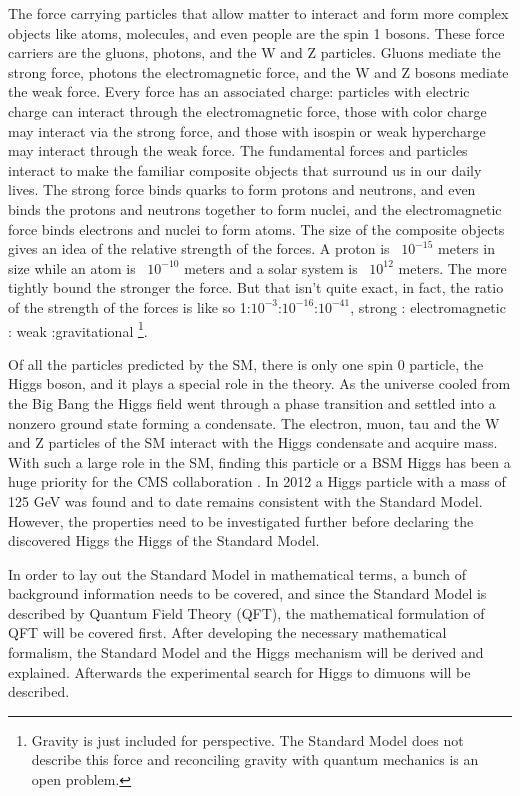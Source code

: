 The force carrying particles that allow matter to interact and form more complex objects like atoms, molecules, and even people are the spin 1 bosons. These force carriers are the gluons, photons, and the W and Z particles. Gluons mediate the strong force, photons the electromagnetic force, and the W and Z bosons mediate the weak force. Every force has an associated charge: particles with electric charge can interact through the electromagnetic force, those with color charge may interact via the strong force, and those with isospin or weak hypercharge may interact through the weak force. The fundamental forces and particles interact to make the familiar composite objects that surround us in our daily lives. The strong force binds quarks to form protons and neutrons, and even binds the protons and neutrons together to form nuclei, and the electromagnetic force binds electrons and nuclei to form atoms. The size of the composite objects gives an idea of the relative strength of the forces. A proton is ~$10^{-15}$ meters in size while an atom is ~$10^{-10}$ meters and a solar system is ~$10^{12}$ meters. The more tightly bound the stronger the force. But that isn't quite exact, in fact, the ratio of the strength of the forces is like so 1:$10^{-3}$:$10^{-16}$:$10^{-41}$, strong : electromagnetic : weak :gravitational \footnote{Gravity is just included for perspective. The Standard Model does not describe this force and reconciling gravity with quantum mechanics is an open problem.}. 

Of all the particles predicted by the SM, there is only one spin 0 particle, the Higgs boson, and it plays a special role in the theory. As the universe cooled from the Big Bang the Higgs field went through a phase transition and settled into a nonzero ground state forming a condensate. The electron, muon, tau and the W and Z particles of the SM interact with the Higgs condensate and acquire mass. With such a large role in the SM, finding this particle or a BSM Higgs has been a huge priority for the CMS collaboration \cite{tdr}. In 2012 a Higgs particle with a mass of 125 GeV was found and to date remains consistent with the Standard Model. However, the properties need to be investigated further before declaring the discovered Higgs the Higgs of the Standard Model. 

In order to lay out the Standard Model in mathematical terms, a bunch of background information needs to be covered, and since the Standard Model is described by Quantum Field Theory (QFT), the mathematical formulation of QFT will be covered first. After developing the necessary mathematical formalism, the Standard Model and the Higgs mechanism will be derived and explained. Afterwards the experimental search for Higgs to dimuons will be described.

